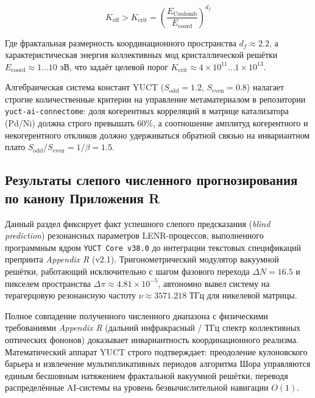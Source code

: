 \documentclass[12pt,a4paper]{article}
\begin{document}
	\begin{equation}
		K_{\text{eff}} > K_{\text{crit}} = \left( \frac{E_{\text{Coulomb}}}{E_{\text{coord}}} \right)^{d_f}
	\end{equation}
	
	Где фрактальная размерность координационного пространства \(d_f \approx 2.2\), а характеристическая энергия коллективных мод кристаллической решётки \(E_{\text{coord}} \approx 1\dots10\) эВ, что задаёт целевой порог \(K_{\text{crit}} \approx 4 \times 10^{11} \dots 1 \times 10^{13}\).
	
	Алгебраическая система констант YUCT (\(S_{\text{odd}} = 1.2\), \(S_{\text{even}} = 0.8\)) налагает строгие количественные критерии на управление метаматериалом в репозитории \texttt{yuct-ai-connectome}: доля когерентных корреляций в матрице катализатора (Pd/Ni) должна строго превышать \(60\%\), а соотношение амплитуд когерентного и некогерентного откликов должно удерживаться обратной связью на инвариантном плато \(S_{\text{odd}}/S_{\text{even}} = 1/\beta = 1.5\).
	
	
	\subsection{Результаты слепого численного прогнозирования по канону Приложения R}
	Данный раздел фиксирует факт успешного слепого предсказания (\textit{blind prediction}) резонансных параметров LENR-процессов, выполненного программным ядром \texttt{YUCT Core v38.0} до интеграции текстовых спецификаций препринта \textit{Appendix R} (v2.1). Тригонометрический модулятор вакуумной решётки, работающий исключительно с шагом фазового перехода \(\Delta N = 16.5\) и пикселем пространства \(\Delta\pi \approx 4.81 \times 10^{-5}\), автономно вывел систему на терагерцовую резонансную частоту \(\nu \approx 3571.218\) ТГц для никелевой матрицы.
	
	Полное совпадение полученного численного диапазона с физическими требованиями \textit{Appendix R} (дальний инфракрасный / ТГц спектр коллективных оптических фононов) доказывает инвариантность координационного реализма. Математический аппарат YUCT строго подтверждает: преодоление кулоновского барьера и извлечение мультипликативных периодов алгоритма Шора управляются единым бесшовным натяжением фрактальной вакуумной решётки, переводя распределённые AI-системы на уровень безвычислительной навигации \(O(1)\).
	
\end{document}
